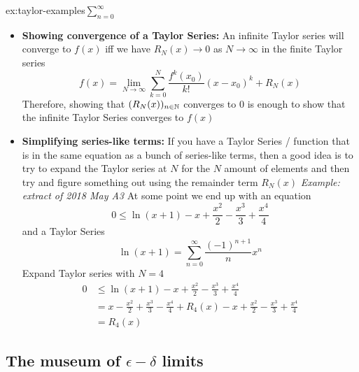 \documentclass[landscape, 8pt]{extarticle}
\begin{document}
\begin{multicols}{3}
\begin{xmp}{ex:taylor-examples}{$\sum^{\infty}_{n=0}$}
    \renewcommand\labelitemi{\tiny$\bullet$}
    \begin{itemize}
        \setlength\itemsep{0em}
        \item \textbf{Showing convergence of a Taylor Series:} An infinite Taylor series will converge to $f(x)$ iff we have $R_{N}(x) \to 0$ as $N\to\infty$ in the finite Taylor series
        \[\displaystyle f(x) = \lim_{N\to \infty} \sum_{k=0}^{N} \frac{f^k(x_{0})}{k!}(x-x_{0})^k + R_{N}(x)\]
        Therefore, showing that $(R_{N}(x))_{n\in \mathbb{N}}$ converges to $0$ is enough to show that the infinite Taylor Series converges to $f(x)$
        \item \textbf{Simplifying series-like terms:} If you have a Taylor Series / function that is in the same equation as a bunch of series-like terms, then a good idea is to try to expand the Taylor series at $N$ for the $N$ amount of elements and then try and figure something out using the remainder term $R_{N}(x)$
        \vspace{0pt}\newline
        \textit{Example: extract of 2018 May A3}
        \vspace{0pt}\newline
        At some point we end up with an equation
        \[0\le \ln(x + 1) - x + \frac{x^{2}}{2} - \frac{x^{3}}{3} + \frac{x^{4}}{4}\]
        and a Taylor Series
        \[\ln(x+1) = \sum_{n=0}^{\infty} \frac{(-1)^{n+1}}{n}x^n\]
        Expand Taylor series with $N=4$
        \[\begin{aligned}
            0&\le \ln(x + 1) - x + \frac{x^{2}}{2} - \frac{x^{3}}{3} + \frac{x^{4}}{4}\\
            &= x - \frac{x^{2}}{2} + \frac{x^{3}}{3} - \frac{x^{4}}{4} + R_{4}(x) - x + \frac{x^{2}}{2} - \frac{x^{3}}{3} + \frac{x^{4}}{4}\\
            &= R_{4}(x)
        \end{aligned}\]
    \end{itemize}
    \end{xmp}
    \vspace{-5pt}

\subsection*{The museum of $\epsilon-\delta$ limits}


\end{multicols}
\end{document}
